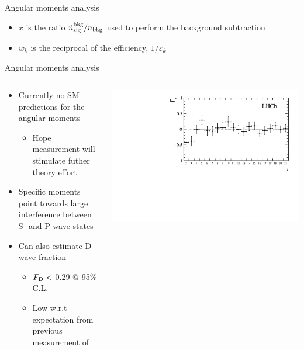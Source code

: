 \documentclass[aspectratio=1610]{beamer}
\begin{document}
\begin{frame}{Angular moments analysis}
\bigskip

\begin{itemize}
\item $x$ is the ratio $\tilde{n}^{\rm bkg}_{\rm sig}/n_{\rm bkg}$ used to perform the background subtraction
\item $w_{k}$ is the reciprocal of the efficiency, $1/\varepsilon_{k}$
\end{itemize}

\end{frame}

\begin{frame}{Angular moments analysis}
\begin{columns}
\begin{column}{0.55\textwidth}
\begin{itemize}
  \item Currently no SM predictions for the angular moments 
  \begin{itemize}
    \item[\ding{80}] Hope measurement will stimulate futher theory effort
  \end{itemize}
\end{itemize}
\begin{itemize}
  \item Specific moments point towards large interference between S- and P-wave states 
  \item Can also estimate D-wave fraction
  \begin{itemize}
    \item $F_{\rm D} <$ 0.29 @ 95\% C.L.
    \item Low w.r.t expectation from previous measurement of \decay{\Bd}{\jpsi(\to\mumu) \Kp\pim}
\end{itemize}
\end{itemize}
\end{column}
\begin{column}{0.45\textwidth}
\centering
\includegraphics[height=0.44\textheight]{figs/kpimm/angular-analysis/mom_results_2_21.pdf}\\

\end{column}
\end{columns}
\end{frame}
\end{document}
